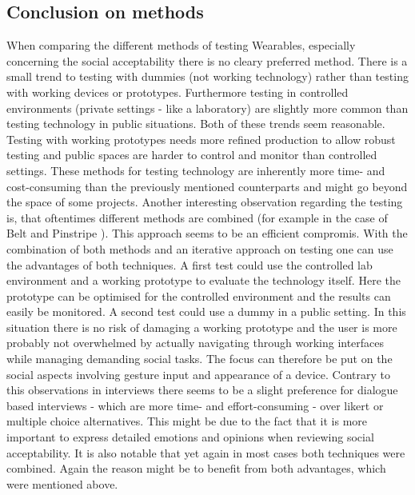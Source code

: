 \documentclass{sigchi}
\begin{document}
\subsection{Conclusion on methods}
When comparing the different methods of testing Wearables, especially concerning the social acceptability there is no cleary preferred method. There is a small trend to testing with dummies (not working technology) rather than testing with working devices or prototypes. Furthermore testing in controlled environments (private settings - like a laboratory) are slightly more common than testing technology in public situations. Both of these trends seem reasonable. Testing with working prototypes needs more refined production to allow robust testing and public spaces are harder to control and monitor than controlled settings. These methods for testing technology are inherently more time- and cost-consuming than the previously mentioned counterparts and might go beyond the space of some projects.
Another interesting observation regarding the testing is, that oftentimes different methods are combined (for example in the case of Belt \cite{belt} and Pinstripe \cite{pinstripe}). This approach seems to be an efficient compromis. With the combination of both methods and an iterative approach on testing one can use the advantages of both techniques. A first test could use the controlled lab environment and a working prototype to evaluate the technology itself. Here the prototype can be optimised for the controlled environment and the results can easily be monitored. A second test could use a dummy in a public setting. In this situation there is no risk of damaging a working prototype and the user is more probably not overwhelmed by actually navigating through working interfaces while managing demanding social tasks. The focus can therefore be put on the social aspects involving gesture input and appearance of a device.
Contrary to this observations in interviews there seems to be a slight preference for dialogue based interviews - which are more time- and effort-consuming - over likert or multiple choice alternatives. This might be due to the fact that it is more important to express detailed emotions and opinions when reviewing social acceptability.
It is also notable that yet again in most cases both techniques were combined. Again the reason might be to benefit from both advantages, which were mentioned above.
\end{document}
